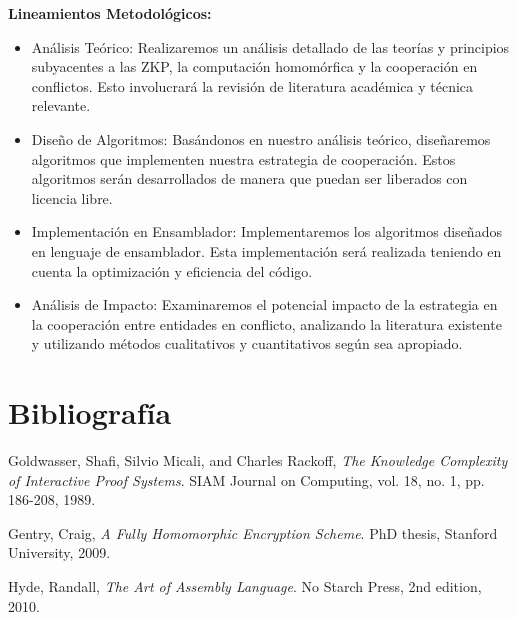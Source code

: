 \documentclass[12pt]{article}
\begin{document}
\textbf{Lineamientos Metodológicos:}
\begin{itemize}
    \item{Análisis Teórico: Realizaremos un análisis detallado de las teorías y principios subyacentes a las ZKP, la computación homomórfica y la cooperación en conflictos. Esto involucrará la revisión de literatura académica y técnica relevante.}
    \item{Diseño de Algoritmos: Basándonos en nuestro análisis teórico, diseñaremos algoritmos que implementen nuestra estrategia de cooperación. Estos algoritmos serán desarrollados de manera que puedan ser liberados con licencia libre.}
    \item{Implementación en Ensamblador: Implementaremos los algoritmos diseñados en lenguaje de ensamblador. Esta implementación será realizada teniendo en cuenta la optimización y eficiencia del código.}
    \item{Análisis de Impacto: Examinaremos el potencial impacto de la estrategia en la cooperación entre entidades en conflicto, analizando la literatura existente y utilizando métodos cualitativos y cuantitativos según sea apropiado.}
\end{itemize}



\section{Bibliografía}
\begin{thebibliography}{9}
    Goldwasser, Shafi, Silvio Micali, and Charles Rackoff,
    \emph{The Knowledge Complexity of Interactive Proof Systems}.
    SIAM Journal on Computing,
    vol. 18, no. 1, pp. 186-208, 1989.

    Gentry, Craig,
    \emph{A Fully Homomorphic Encryption Scheme}.
    PhD thesis, Stanford University, 2009.
    
    Hyde, Randall,
    \emph{The Art of Assembly Language}.
    No Starch Press,
    2nd edition, 2010.

\end{thebibliography}
\end{document}
